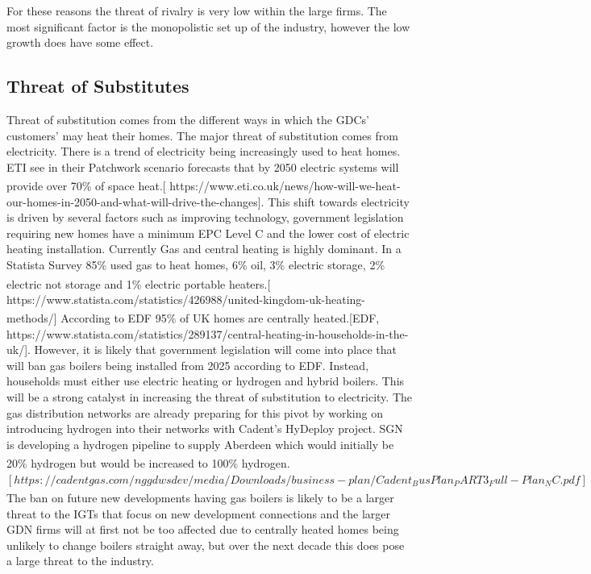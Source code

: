 \documentclass[11pt]{article}		%
\newcommand{\supercite}[1]{\textsuperscript{\cite{#1}}}		%
\begin{document}
                For these reasons the threat of rivalry is very low within the large firms. The most significant factor is the monopolistic set up of the industry, however the low growth does have some effect.

        \subsection[Threat of Substitutes]{Threat of Substitutes}
                Threat of substitution comes from the different ways in which the GDCs’ customers’ may heat their homes.
                The major threat of substitution comes from electricity. There is a trend of electricity being increasingly used to heat homes. ETI see in their Patchwork scenario forecasts that by 2050 electric systems will provide over 70\% of space heat.\supercite{heating_tech}[  https://www.eti.co.uk/news/how-will-we-heat-our-homes-in-2050-and-what-will-drive-the-changes].  This shift towards electricity is driven by several factors such as improving technology, government legislation requiring new homes have a minimum EPC Level C and the lower cost of electric heating installation. Currently Gas and central heating is highly dominant. In a Statista Survey 85\% used gas to heat homes, 6\% oil, 3\% electric storage, 2\% electric not storage and 1\% electric portable heaters.\supercite{heating}[  https://www.statista.com/statistics/426988/united-kingdom-uk-heating-methods/]  According to EDF 95\% of UK homes are centrally heated.\supercite{central_heating}[EDF,  https://www.statista.com/statistics/289137/central-heating-in-households-in-the-uk/].   However, it is likely that government legislation will come into place that will ban gas boilers being installed from 2025 according to EDF. Instead, households must either use electric heating or hydrogen and hybrid boilers. This will be a strong catalyst in increasing the threat of substitution to electricity. The gas distribution networks are already preparing for this pivot by working on introducing hydrogen into their networks with Cadent’s HyDeploy project. SGN is developing a hydrogen pipeline to supply Aberdeen which would initially be 20\% hydrogen but would be increased to 100\% hydrogen. \supercite{Cadent_Plan}
                $[  https://cadentgas.com/nggdwsdev/media/Downloads/business-plan/Cadent_BusPlan_PART3_Full-Plan_NC.pdf]$  The ban on future new developments having gas boilers \supercite{boiler_ban} is likely to be a larger threat to the IGTs that focus on new development connections and the larger GDN firms will at first not be too affected due to centrally heated homes being unlikely to change boilers straight away, but over the next decade this does pose a large threat to the industry.
\end{document}
